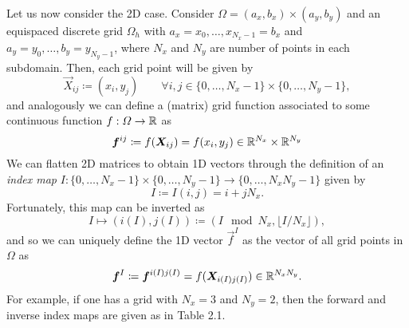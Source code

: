 Let us now consider the 2D case. Consider $\Omega = (a_x, b_x) \times (a_y, b_y)$ and an equispaced discrete grid $\Omega_h$ with $ a_x = x_0, \hdots, x_{N_x-1} = b_x$ and $a_y = y_0, \hdots, b_y = y_{N_y-1}$, where $N_x$ and $N_y$ are number of points in each subdomain. Then, each grid point will be given by     
\begin{equation}
    \vec X_{ij} \coloneqq (x_i, y_j) \qquad \forall i,j \in \{0,\hdots, N_x-1\}\times \{0,\hdots, N_y-1\},
\end{equation}
and analogously we can define a (matrix) grid function associated to some continuous function $f:\Omega\to \mathbb{R}$ as 
\begin{equation*}
    \vec f^{ij} \coloneqq f(\vec X_{ij}) = f(x_i, y_j) \in \R^{N_x}\times \R^{N_y}
\end{equation*}
We can flatten 2D matrices to obtain 1D vectors through the definition of an \emph{index map} $I: \{0,\hdots, N_x-1\} \times \{0, \hdots, N_y-1\}\to \{0,\hdots, N_x N_y-1\}$ given by 
\begin{equation*}
    I \coloneqq I(i,j) = i + j N_x.
\end{equation*}
Fortunately, this map can be inverted as
\begin{equation*}
    I \mapsto (i(I), j(I)) \coloneqq (I\mod N_x, \lfloor I/N_x \rfloor),
\end{equation*}
and so we can uniquely define the 1D vector $\vec f^I$ as the vector of all grid points in $\Omega$ as
\begin{equation*}
    \vec f^I \coloneqq \vec f^{i(I)j(I)} = f(\vec X_{i(I)j(I)}) \in \R^{N_x N_y}.
\end{equation*}
For example, if one has a grid with $N_x=3$ and $N_y=2$, then the forward and inverse index maps are given as in Table 2.1.
